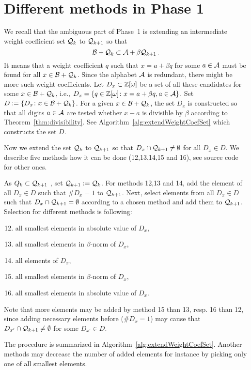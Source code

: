 \section{Different methods in Phase 1}
\label{sec:methodsOne}


We recall that the ambiguous part of Phase~1 is extending an intermediate weight coefficient set $\mathcal{Q}_k$ to $\mathcal{Q}_{k+1}$ so that 
$$
\mathcal{B}+\mathcal{Q}_k \subset \mathcal{A}+\beta \mathcal{Q}_{k+1}\,.
$$
It means that a weight coefficient $q$ such that $x=a+\beta q$ for some $a\in\mathcal{A}$ must be found for all $x\in \mathcal{B}+\mathcal{Q}_k$. Since the alphabet $\mathcal{A}$ is redundant, there might be more such weight coefficients. Let $D_x\subset \mathbb{Z}[\omega]$ be a set of all these candidates for some $x\in \mathcal{B}+\mathcal{Q}_k$, i.e., $D_x=\{q\in\mathbb{Z}[\omega]\colon x=a+\beta q, a\in\mathcal{A}\}$. Set $D:=\{D_x\colon x\in \mathcal{B}+\mathcal{Q}_k\}$. For a given $x\in \mathcal{B}+\mathcal{Q}_k$, the set $D_x$ is constructed so that all digits $a\in\mathcal{A}$ are tested whether $x-a$ is divisible by $\beta$ according to Theorem~\ref{thm:divisibility}. See Algorithm~\ref{alg:extendWeightCoefSet} which constructs the set $D$.

Now we extend the set $\mathcal{Q}_k$ to $\mathcal{Q}_{k+1}$ so that $D_x \cap \mathcal{Q}_{k+1} \neq \emptyset$ for all $D_x \in D$. We describe five methods how it can be done (12,13,14,15 and 16), see source code for other ones. 

As $Q_k\subset \mathcal{Q}_{k+1}$ , set $\mathcal{Q}_{k+1}:=\mathcal{Q}_k$. For methods 12,13 and 14, add  the element of all $D_x\in D$ such that $\#D_x=1$ to $\mathcal{Q}_{k+1}$. Next, select elements from all $D_x\in D$ such that $D_x \cap \mathcal{Q}_{k+1} = \emptyset$ according to a chosen method and add them to $\mathcal{Q}_{k+1}$. Selection for different methods is following:
\begin{enumerate}[ 1 --]
	\setcounter{enumi}{11}
	\item all smallest elements in absolute value of $D_x$,
	\item all smallest elements in $\beta$-norm of $D_x$,
	\item all elements of $D_x$,
	\item all smallest elements in $\beta$-norm of $D_x$,
	\item all smallest elements in absolute value of $D_x$.
\end{enumerate}
Note that more elements may be added by method 15 than 13, resp. 16 than 12, since adding necessary elements before ($\#D_x=1$)  may cause that $D_{x'}\cap \mathcal{Q}_{k+1} \neq \emptyset$ for some $D_{x'}\in D$. 

The procedure is summarized in Algorithm~\ref{alg:extendWeightCoefSet}. 
Another methods may decrease the number of added elements for instance by picking only one of all smallest elements.
	


